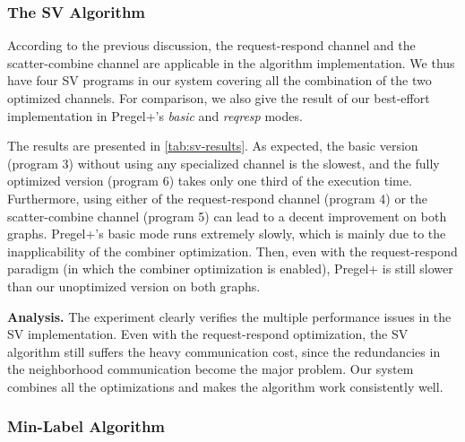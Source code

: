 \documentclass{sokendai_thesis} %
\newcommand{\PP}{Pregel+}
\begin{document}
\subsubsection{The SV Algorithm}
\label{sec:eval-scc}

According to the previous discussion, the request-respond channel and the scatter-combine channel are applicable in the algorithm implementation.
We thus have four SV programs in our system covering all the combination of the two optimized channels.
For comparison, we also give the result of our best-effort implementation in \PP{}'s \textit{basic} and \textit{reqresp} modes.

The results are presented in \autoref{tab:sv-results}.
As expected, the basic version (program 3) without using any specialized channel is the slowest, and the fully optimized version (program 6) takes only one third of the execution time.
Furthermore, using either of the request-respond channel (program 4) or the scatter-combine channel (program 5) can lead to a decent improvement on both graphs.
\PP{}'s basic mode runs extremely slowly, which is mainly due to the inapplicability of the combiner optimization.
Then, even with the request-respond paradigm (in which the combiner optimization is enabled), \PP{} is still slower than our unoptimized version on both graphs.

\textbf{Analysis.}
The experiment clearly verifies the multiple performance issues in the SV implementation.
Even with the request-respond optimization, the SV algorithm still suffers the heavy communication cost, since the redundancies in the neighborhood communication become the major problem.
Our system combines all the optimizations and makes the algorithm work consistently well.%

\subsubsection{Min-Label Algorithm}
\label{sec:eval-scc}
\end{document}

